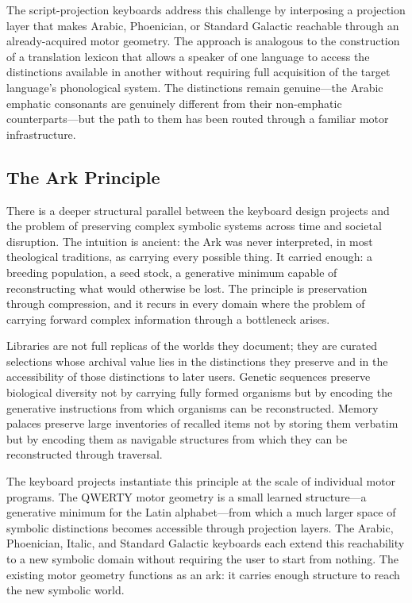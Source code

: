 \documentclass[12pt,a4paper]{article}
\theoremstyle{plain}
\theoremstyle{definition}
\theoremstyle{remark}
\begin{document}
The script-projection keyboards address this challenge by interposing a
projection layer that makes Arabic, Phoenician, or Standard Galactic reachable
through an already-acquired motor geometry. The approach is analogous to the
construction of a translation lexicon that allows a speaker of one language to
access the distinctions available in another without requiring full
acquisition of the target language's phonological system. The distinctions
remain genuine---the Arabic emphatic consonants are genuinely different from
their non-emphatic counterparts---but the path to them has been routed through
a familiar motor infrastructure.

\subsection{The Ark Principle}

There is a deeper structural parallel between the keyboard design projects and
the problem of preserving complex symbolic systems across time and societal
disruption. The intuition is ancient: the Ark was never interpreted, in most
theological traditions, as carrying every possible thing. It carried enough: a
breeding population, a seed stock, a generative minimum capable of
reconstructing what would otherwise be lost. The principle is preservation
through compression, and it recurs in every domain where the problem of
carrying forward complex information through a bottleneck arises.

Libraries are not full replicas of the worlds they document; they are curated
selections whose archival value lies in the distinctions they preserve and in
the accessibility of those distinctions to later users. Genetic sequences
preserve biological diversity not by carrying fully formed organisms but by
encoding the generative instructions from which organisms can be reconstructed.
Memory palaces preserve large inventories of recalled items not by storing
them verbatim but by encoding them as navigable structures from which they can
be reconstructed through traversal.

The keyboard projects instantiate this principle at the scale of individual
motor programs. The QWERTY motor geometry is a small learned structure---a
generative minimum for the Latin alphabet---from which a much larger space of
symbolic distinctions becomes accessible through projection layers. The Arabic,
Phoenician, Italic, and Standard Galactic keyboards each extend this
reachability to a new symbolic domain without requiring the user to start from
nothing. The existing motor geometry functions as an ark: it carries enough
structure to reach the new symbolic world.
\end{document}
